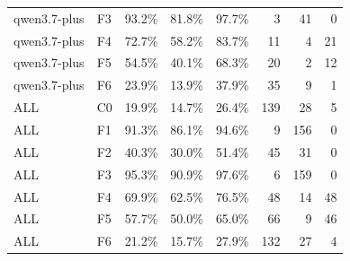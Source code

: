 \begin{tabular}{llrrrrrr}
qwen3.7-plus & F3 & 93.2\% & 81.8\% & 97.7\% & 3 & 41 & 0 \\
qwen3.7-plus & F4 & 72.7\% & 58.2\% & 83.7\% & 11 & 4 & 21 \\
qwen3.7-plus & F5 & 54.5\% & 40.1\% & 68.3\% & 20 & 2 & 12 \\
qwen3.7-plus & F6 & 23.9\% & 13.9\% & 37.9\% & 35 & 9 & 1 \\
ALL & C0 & 19.9\% & 14.7\% & 26.4\% & 139 & 28 & 5 \\
ALL & F1 & 91.3\% & 86.1\% & 94.6\% & 9 & 156 & 0 \\
ALL & F2 & 40.3\% & 30.0\% & 51.4\% & 45 & 31 & 0 \\
ALL & F3 & 95.3\% & 90.9\% & 97.6\% & 6 & 159 & 0 \\
ALL & F4 & 69.9\% & 62.5\% & 76.5\% & 48 & 14 & 48 \\
ALL & F5 & 57.7\% & 50.0\% & 65.0\% & 66 & 9 & 46 \\
ALL & F6 & 21.2\% & 15.7\% & 27.9\% & 132 & 27 & 4 \\
\bottomrule
\end{tabular}

